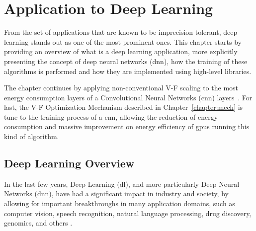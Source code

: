 
\chapter{Application to Deep Learning}
\label{chapter:results}

From the set of applications that are known to be imprecision tolerant, deep learning stands out as one of the most prominent ones. This chapter starts by providing an overview of what is a deep learning application, more explicitly  presenting the concept of deep neural networks (\acrshort{dnn}), how the training of these algorithms is performed and how they are implemented using high-level libraries.

The chapter continues by applying non-conventional V-F scaling to the most energy consumption layers of a Convolutional Neural Networks (\acrshort{cnn}) layers~\cite{li_evaluating_2016}. For last, the V-F Optimization Mechanism described in Chapter~\ref{chapter:mech} is tune to the training process of a \acrshort{cnn}, allowing the reduction of energy consumption and massive improvement on energy efficiency of \acrshort{gpu}s running this kind of algorithm.


\section{Deep Learning Overview}
\label{section:problem}

In the last few years, Deep Learning (\acrshort{dl}), and more particularly Deep Neural Networks (\acrshort{dnn}), have had a significant impact in industry and society, by allowing for important breakthroughs in many application domains, such as computer vision, speech recognition, natural language processing, drug discovery, genomics, and others \cite{shrestha_review_2019}.

